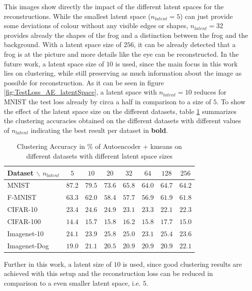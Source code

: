 \documentclass[12pt,DIV14,BCOR12mm,a4paper,footexclude,headinclude,halfparskip-,twoside,openright,openany,cleardoubleempty,idxtotoc,bibtotoc]{scrreprt} %
\numberwithin{equation}{chapter}
\begin{document}
This images show directly the impact of the different latent spaces for the reconstructions. While the smallest latent space ($n_{latent}=5$) can just provide some deviations of colour without any visible edges or shapes, $n_{latent}=32$ provides already the shapes of the frog and a distinction between the frog and the background. With a latent space size of $256$, it can be already detected that a frog is at the picture and more details like the eye can be reconstructed.
In the future work, a latent space size of $10$ is used, since the main focus in this work lies on clustering, while still preserving as much information about the image as possible for reconstruction. As it can be seen in figure \ref{fig:TestLoss_AE_latentSpace}, a latent space with $n_{latent}=10$ reduces for MNIST the test loss already by circa a half in comparison to a size of $5$. To show the effect of the latent space size on the different datasets, table \ref{tab:ClusterACC_n_latent} summarizes the clustering accuracies obtained on the different datasets with different values of $n_{latent}$ indicating the best result per dataset in \textbf{bold}.
	\begin{table}[htb!]
    		\centering
    		\caption{Clustering Accuracy in \% of Autoencoder + kmeans on different datasets with different latent space sizes}
    		\label{tab:ClusterACC_n_latent}
    		\begin{tabular}{l|ccccccc}
        		Dataset $\backslash$ $n_{latent}$ & $5$ & $10$ & $20$ & $32$ & $64$ & $128$ & $256$\\ \hline
        		MNIST & $\mathbf{87.2}$ & $79.5$ & $73.6$ & $65.8$ & $64.0$ & $64.7$ & $64.2$\\
        		F-MNIST & $\mathbf{63.3}$ & $62.0$ & $58.4$ & $57.7$ & $56.9$ & $61.9$ & $61.8$\\
        		CIFAR-10 & $23.4$ & $24.6$ & $\mathbf{24.9}$ & $23.1$ & $23.3$ & $22.1$ & $22.3$\\
        		CIFAR-100 & $14.4$ & $15.7$ & $15.8$ & $\mathbf{16.2}$ & $15.8$ & $17.7$ & $15.0$\\
        		Imagenet-10 & $24.1$ & $23.9$ & $\mathbf{25.8}$ & $25.0$ & $23.1$ & $25.4$ & $23.6$\\
        		Imagenet-Dog & $19.0$ & $21.1$ & $20.5$ & $20.9$ & $20.9$ & $20.9$ & $\mathbf{22.1}$\\
    		\end{tabular}
	\end{table}
Further in this work, a latent size of $10$ is used, since good clustering results are achieved with this setup and the reconstruction loss can be reduced in comparison to a even smaller latent space, i.e. $5$.
\end{document}
